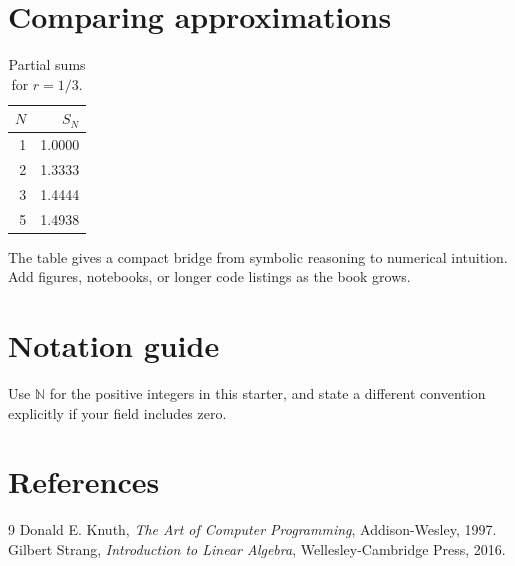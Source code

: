 \documentclass[11pt]{book}
\begin{document}
\chapter{Comparing approximations}
\begin{table}[ht]
\centering
\caption{Partial sums for $r=1/3$.}
\begin{tabular}{@{}rr@{}}
\toprule
$N$ & $S_N$ \\
\midrule
1 & 1.0000 \\
2 & 1.3333 \\
3 & 1.4444 \\
5 & 1.4938 \\
\bottomrule
\end{tabular}
\end{table}
The table gives a compact bridge from symbolic reasoning to numerical
intuition. Add figures, notebooks, or longer code listings as the book grows.
\appendix
\chapter{Notation guide}
Use $\mathbb{N}$ for the positive integers in this starter, and state a
different convention explicitly if your field includes zero.
\backmatter
\chapter*{References}
\begin{thebibliography}{9}
 Donald E. Knuth, \emph{The Art of Computer Programming},
  Addison-Wesley, 1997.
 Gilbert Strang, \emph{Introduction to Linear Algebra},
  Wellesley-Cambridge Press, 2016.
\end{thebibliography}
\end{document}
